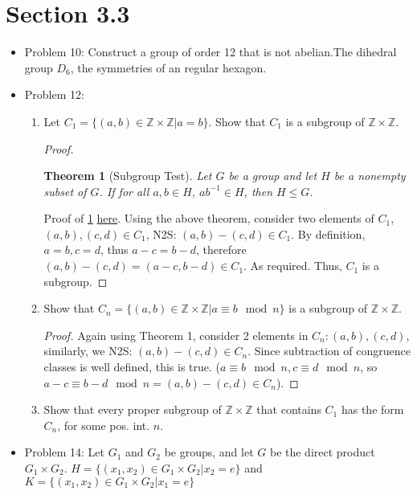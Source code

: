 \documentclass[hidelinks,12pt]{article}
\title{\scalebox{2}{Math 531 Homework 5}}
\author{\scalebox{1.5}{Theo Koss}}
\date{February 2021}
\newtheorem{theorem}{Theorem}
\newcommand{\Z}{\mathbb{Z}}
\begin{document}
\maketitle
\section{Section 3.3}
\begin{itemize}
\item Problem 10: Construct a group of order 12 that is not abelian.\newline The dihedral group $D_6$, the symmetries of an regular hexagon.
\item Problem 12:\begin{enumerate}[label=(\alph*)]
    \item Let $C_1=\{(a,b)\in\Z\times\Z|a=b\}$. Show that $C_1$ is a subgroup of $\Z\times\Z$.\begin{proof}
    \begin{theorem}[Subgroup Test]\label{sgtest}Let $G$ be a group and let $H$ be a nonempty subset of $G$. If for all $a,b\in H$, $ab^{-1}\in H$, then $H\leqslant G$. \end{theorem}Proof of \ref{sgtest} \href{https://en.wikipedia.org/wiki/Subgroup_test}{\color{cyan}here}.
    Using the above theorem, consider two elements of $C_1$, $(a,b),(c,d)\in C_1$, N2S: $(a,b)-(c,d)\in C_1$. By definition, $a=b,c=d$, thus $a-c=b-d$, therefore $(a,b)-(c,d)=(a-c,b-d)\in C_1$. As required. Thus, $C_1$ is a subgroup.\end{proof}
    \item Show that $C_n=\{(a,b)\in\Z\times\Z|a\equiv b\mod{n}\}$ is a subgroup of $\Z\times\Z$.\begin{proof} Again using Theorem 1, consider 2 elements in $C_n:(a,b),(c,d)$, similarly, we N2S: $(a,b)-(c,d)\in C_n$. Since subtraction of congruence classes is well defined, this is true. ($a\equiv b\mod{n},c\equiv d\mod{n}$, so $a-c\equiv b-d\mod{n}=(a,b)-(c,d)\in C_n$).\end{proof}
    \item Show that every proper subgroup of $\Z\times\Z$ that contains $C_1$ has the form $C_n$, for some pos. int. $n$.
\end{enumerate}
\item Problem 14: Let $G_1$ and $G_2$ be groups, and let $G$ be the direct product $G_1\times G_2$. $H=\{(x_1,x_2)\in G_1\times G_2|x_2=e\}$ and $K=\{(x_1,x_2)\in G_1\times G_2|x_1=e\}$\begin{enumerate}[label=(\alph*)]

\end{enumerate}
\end{itemize}
\end{document}
